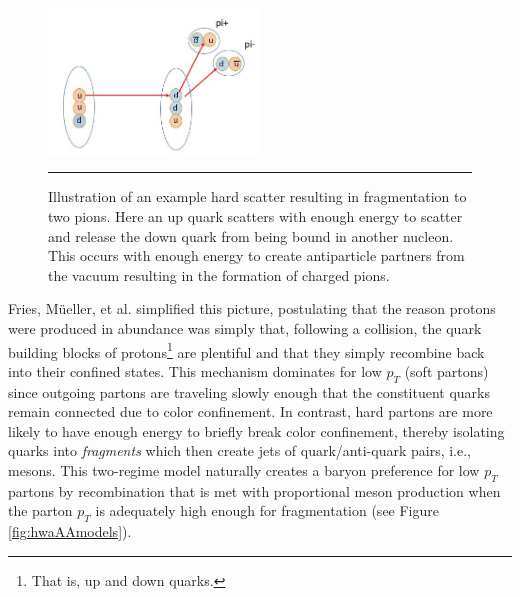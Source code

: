 \begin{figure}[htbp!]
  \centering  
    \includegraphics[width=0.5\textwidth]{Figures/fragmentationdiag.JPG}
 \rule{35em}{0.5pt}
  \caption[Illustration of an example hard scatter resulting in fragmentation to two pions]{Illustration of an example hard scatter resulting in fragmentation to two pions. Here an up quark scatters with enough energy to scatter and release the down quark from being bound in another nucleon. This occurs with enough energy to create antiparticle partners from the vacuum resulting in the formation of charged pions.}
  \label{fig:fragmentationdiag}   
\end{figure} 
Fries, M{\"u}eller, et al. simplified this picture, postulating that the reason protons were produced in abundance was simply that, following a collision, the quark building blocks of protons\footnote{That is, up and down quarks.} are plentiful and that they simply recombine back into their confined states. This mechanism dominates for low $p_{T}$ (soft partons) since outgoing partons are traveling slowly enough that the constituent quarks remain connected due to color confinement. In contrast, hard partons are more likely to have enough energy to briefly break color confinement, thereby isolating quarks into \textit{fragments} which then create jets of quark/anti-quark pairs, i.e., mesons. This two-regime model naturally creates a baryon preference for low $p_{T}$ partons by recombination that is met with proportional meson production when the parton $p_{T}$ is adequately high enough for fragmentation (see Figure \ref{fig:hwaAAmodels}).


